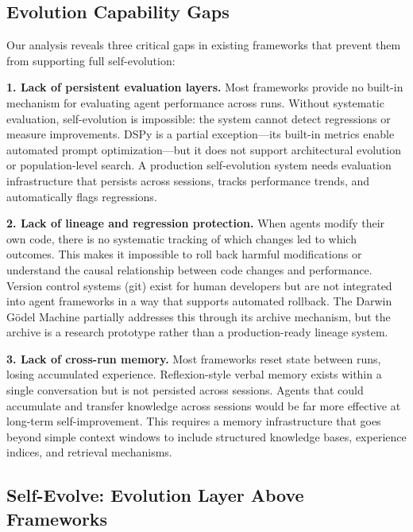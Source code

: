 \documentclass[11pt,a4paper]{article}
\begin{document}
\subsection{Evolution Capability Gaps}

Our analysis reveals three critical gaps in existing frameworks that prevent them from supporting full self-evolution:

\textbf{1. Lack of persistent evaluation layers.} Most frameworks provide no built-in mechanism for evaluating agent performance across runs. Without systematic evaluation, self-evolution is impossible: the system cannot detect regressions or measure improvements. DSPy is a partial exception---its built-in metrics enable automated prompt optimization---but it does not support architectural evolution or population-level search. A production self-evolution system needs evaluation infrastructure that persists across sessions, tracks performance trends, and automatically flags regressions.

\textbf{2. Lack of lineage and regression protection.} When agents modify their own code, there is no systematic tracking of which changes led to which outcomes. This makes it impossible to roll back harmful modifications or understand the causal relationship between code changes and performance. Version control systems (git) exist for human developers but are not integrated into agent frameworks in a way that supports automated rollback. The Darwin G\"{o}del Machine partially addresses this through its archive mechanism, but the archive is a research prototype rather than a production-ready lineage system.

\textbf{3. Lack of cross-run memory.} Most frameworks reset state between runs, losing accumulated experience. Reflexion-style verbal memory exists within a single conversation but is not persisted across sessions. Agents that could accumulate and transfer knowledge across sessions would be far more effective at long-term self-improvement. This requires a memory infrastructure that goes beyond simple context windows to include structured knowledge bases, experience indices, and retrieval mechanisms.

\subsection{Self-Evolve: Evolution Layer Above Frameworks}
\end{document}
